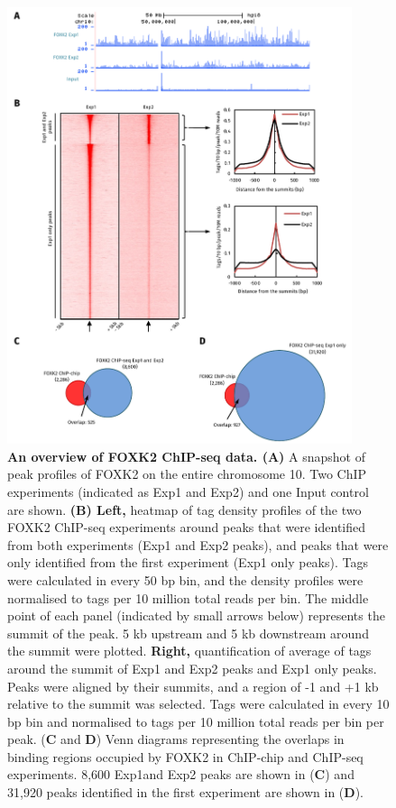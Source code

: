 \begin{figure}[!ht]
    \centering
    \includegraphics[width=0.9\textwidth]{chapter3/figures_overview/fig9.pdf}
    \caption[An overview of FOXK2 ChIP-seq data]{\textbf{An overview of FOXK2 ChIP-seq data. (A)} A snapshot of peak profiles of FOXK2 on the entire chromosome 10. Two ChIP experiments (indicated as Exp1 and Exp2) and one Input control are shown. \textbf{(B) Left,} heatmap of tag density profiles of the two FOXK2 ChIP-seq experiments around peaks that were identified from both experiments (Exp1 and Exp2 peaks), and peaks that were only identified from the first experiment (Exp1 only peaks). Tags were calculated in every 50 bp bin, and the density profiles were normalised to tags per 10 million total reads per bin. The middle point of each panel (indicated by small arrows below) represents the summit of the peak. 5 kb upstream and 5 kb downstream around the summit were plotted. \textbf{Right,} quantification of average of tags around the summit of Exp1 and Exp2 peaks and Exp1 only peaks. Peaks were aligned by their summits, and a region of -1 and +1 kb relative to the summit was selected. Tags were calculated in every 10 bp bin and normalised to tags per 10 million total reads per bin per peak. (\textbf{C} and \textbf{D}) Venn diagrams representing the overlaps in binding regions occupied by FOXK2 in ChIP-chip and ChIP-seq experiments. 8,600 Exp1and Exp2 peaks are shown in (\textbf{C}) and 31,920 peaks identified in the first experiment are shown in (\textbf{D}).}
    \label{fig:fig9}
\end{figure}

